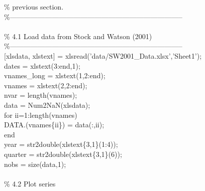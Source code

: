 \hspace{1mm}\textcolor{matlabgreen}{\% previous section. }\\ 
\hspace{1mm}\textcolor{matlabgreen}{\%--------------------------------------------------------------------------  }\\ 
\hspace{1mm} \\ 
\hspace{1mm}\textcolor{matlabgreen}{\% 4.1 Load data from Stock and Watson (2001) }\\ 
\hspace{1mm}\textcolor{matlabgreen}{\%--------------------------------------------------------------------------  }\\ 
\hspace{1mm}[xlsdata, xlstext] = xlsread(\textcolor{matlabpurple}{'data/SW2001\_Data.xlsx'},\textcolor{matlabpurple}{'Sheet1'}); \\ 
\hspace{1mm}dates = xlstext(3:end,1); \\ 
\hspace{1mm}vnames\_long = xlstext(1,2:end); \\ 
\hspace{1mm}vnames = xlstext(2,2:end); \\ 
\hspace{1mm}nvar = length(vnames); \\ 
\hspace{1mm}data   = Num2NaN(xlsdata); \\ 
\hspace{1mm}\textcolor{matlabblue}{for} ii=1:length(vnames) \\ 
\hspace{1mm}\hspace{5mm} DATA.(vnames\{ii\}) = data(:,ii); \\ 
\hspace{1mm}\textcolor{matlabblue}{end} \\ 
\hspace{1mm}year = str2double(xlstext\{3,1\}(1:4)); \\ 
\hspace{1mm}quarter = str2double(xlstext\{3,1\}(6)); \\ 
\hspace{1mm}nobs = size(data,1); \\ 
\hspace{1mm} \\ 
\hspace{1mm}\textcolor{matlabgreen}{\% 4.2 Plot series }\\ 
